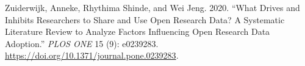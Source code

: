 \documentclass[
  letterpaper,
  DIV=11,
  numbers=noendperiod]{scrartcl}
\newlength{\cslhangindent}
\newenvironment{CSLReferences}[2] %
 {\begin{list}{}{%
  \setlength{\itemindent}{0pt}
  \setlength{\leftmargin}{0pt}
  \setlength{\parsep}{0pt}
  \ifodd #1
   \setlength{\leftmargin}{\cslhangindent}
   \setlength{\itemindent}{-1\cslhangindent}
  \fi
  \setlength{\itemsep}{#2\baselineskip}}}
 {\end{list}}
\begin{document}
\begin{CSLReferences}{1}{0}
Zuiderwijk, Anneke, Rhythima Shinde, and Wei Jeng. 2020. {``What Drives
and Inhibits Researchers to Share and Use Open Research Data? {A}
Systematic Literature Review to Analyze Factors Influencing Open
Research Data Adoption.''} \emph{PLOS ONE} 15 (9): e0239283.
\url{https://doi.org/10.1371/journal.pone.0239283}.

\end{CSLReferences}
\end{document}
